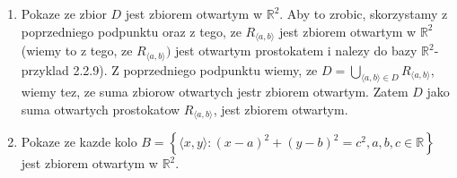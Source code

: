 \documentclass{article}
\begin{document}
\begin{enumerate}[align=left]
\begin{enumerate}
\begin{itemize}
                \end{itemize}
                Zatem niech $a = x$ oraz $b = y$. Poniewaz $\langle x, y \rangle \in D$, wiec $x^{2} + y^{2} < 1$, zatem $r = \sqrt{x^{2} + y^{2}} < 1$. Zatem $1-r > 0$ i co za tym idzie $ \frac{1-r}{8} > 0$. Mamy zatem: 
                \begin{itemize}
                    \item $r = \sqrt{x^{2} + y^{2}}$
                    \item $a - \frac{1-r}{8} = x -\frac{1-r}{8} < x < x  +\frac{1-r}{8} = a +\frac{1-r}{8}$ 
                    \item $b - \frac{1-r}{8} = y -\frac{1-r}{8} < y < y  +\frac{1-r}{8} = b +\frac{1-r}{8}$    
                    
                \end{itemize}
                
                Zatem $\langle x,y \rangle \in R_{\langle x, y \rangle}$. Poniewaz $\langle x, y \rangle \in D$ wiec istnieja takie $a, b$, dokladnie to $a = x, b = y$, ze $\langle x,y \rangle \in R_{\langle a, b\rangle}$, zatem $\langle x, y \rangle \in \bigcup\limits_{\langle a,b \rangle \in D}R_{\langle a, b \rangle}$, co nalezalo pokazac.

                ($\supseteq$) 
                
                Wezmy dowolny element $\langle x,y\rangle \in \bigcup\limits_{\langle a, b \rangle \in D}R_{\langle a, b \rangle}$. Zatem istnieja $\langle a, b \rangle \in D$, takie ze $\langle x, y \rangle \in R_{\langle a, b \rangle}$. Z poprzedniego podpunktu wiemy, ze $R_{\langle a,b \rangle} \subset D$, czyli $\langle x, y \rangle \in D$


            \item Pokaze ze zbior $D$ jest zbiorem otwartym w $\mathbb{R}^{2}$. Aby to zrobic, skorzystamy z poprzedniego podpunktu oraz z tego, ze $R_{\langle a,b \rangle}$ jest zbiorem otwartym w $ \mathbb{R}^{2}$(wiemy to z tego, ze $R_{\langle a, b \rangle})$ jest otwartym prostokatem i nalezy do bazy $\mathbb{R}^{2}$- przyklad 2.2.9). Z poprzedniego podpunktu wiemy, ze $D = \bigcup\limits_{\langle a,b \rangle \in D}R_{\langle a, b\rangle}$, wiemy tez, ze suma zbiorow otwartych jestr zbiorem otwartym. Zatem $D$ jako suma otwartych prostokatow $R_{\langle a,b\rangle}$, jest zbiorem otwartym.

            \item Pokaze ze kazde kolo $B = \left\{ \langle x,y \rangle: (x-a)^{2} + (y-b)^{2} = c^{2}, a,b,c \in \mathbb{R} \right\}$ jest zbiorem otwartym w $\mathbb{R}^{2}$.


\end{enumerate}
\end{enumerate}
\end{document}
